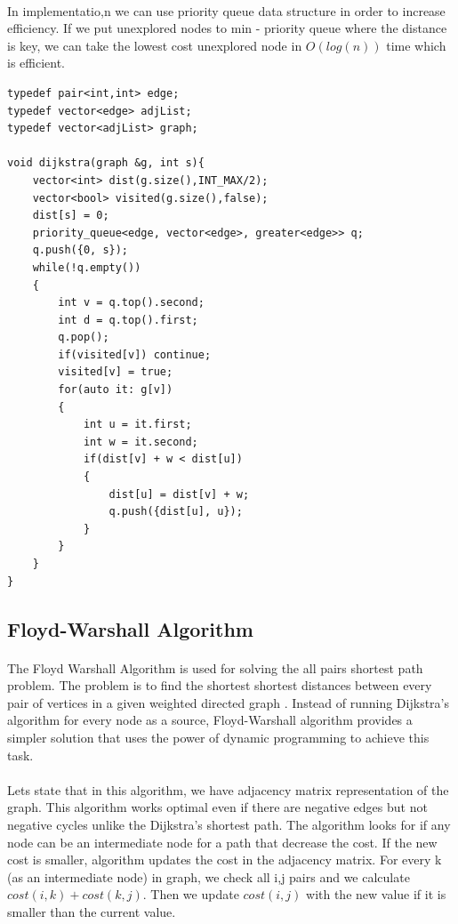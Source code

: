 \documentclass[12pt]{article}
\begin{document}
\paragraph{}
In implementatio,n we can use priority queue data structure in order to increase efficiency. If we put unexplored nodes to min - priority queue where the distance is key, we can take the lowest cost unexplored node in $O(log (n))$ time which is efficient. 
\begin{verbatim}
typedef pair<int,int> edge;
typedef vector<edge> adjList;
typedef vector<adjList> graph;

void dijkstra(graph &g, int s){
    vector<int> dist(g.size(),INT_MAX/2);
    vector<bool> visited(g.size(),false); 
    dist[s] = 0;
    priority_queue<edge, vector<edge>, greater<edge>> q;
    q.push({0, s});
    while(!q.empty())
    {
        int v = q.top().second;
        int d = q.top().first;
        q.pop();
        if(visited[v]) continue;
        visited[v] = true;
        for(auto it: g[v])
        {
            int u = it.first;
            int w = it.second;
            if(dist[v] + w < dist[u])
            {
                dist[u] = dist[v] + w;
                q.push({dist[u], u});
            }
        }
    }
}
\end{verbatim}

\newpage
\subsection{Floyd-Warshall Algorithm}
\paragraph{}
The Floyd Warshall Algorithm is used for solving the all pairs shortest path problem. The problem is to find the shortest shortest distances between every pair of vertices in a given weighted directed graph \cite{8}. Instead of running Dijkstra's algorithm for every node as a source, Floyd-Warshall algorithm provides a simpler solution that uses the power of dynamic programming to achieve this task.
\paragraph{}


Lets state that in this algorithm, we have adjacency matrix representation of the graph. This algorithm works optimal even if there are negative edges but not negative cycles unlike the Dijkstra's shortest path. The algorithm looks for if any node can be an intermediate node for a path that decrease the cost. If the new cost is smaller, algorithm updates the cost in the adjacency matrix. For every k (as an intermediate node) in graph, we check all i,j pairs and we calculate $cost(i,k) +  cost(k,j)$.  Then we update $cost(i,j) $ with the new value if it is smaller than the current value.
\end{document}
